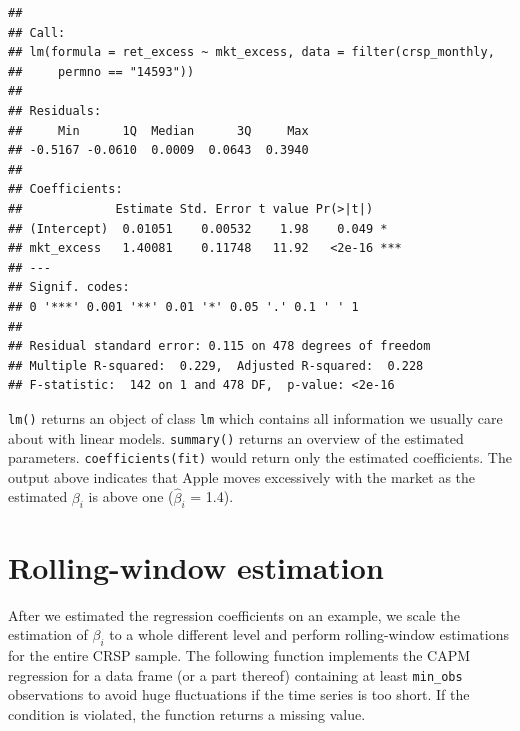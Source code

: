 \documentclass[
]{book}
\newenvironment{Shaded}{\begin{snugshade}}{\end{snugshade}}
\newcommand{\AttributeTok}[1]{\textcolor[rgb]{0.61,0.61,0.61}{#1}}
\newcommand{\ConstantTok}[1]{\textcolor[rgb]{0,0,0}{#1}}
\newcommand{\ControlFlowTok}[1]{\textcolor[rgb]{0.27,0.27,0.27}{\textbf{#1}}}
\newcommand{\DecValTok}[1]{\textcolor[rgb]{0.06,0.06,0.06}{#1}}
\newcommand{\FunctionTok}[1]{\textcolor[rgb]{0,0,0}{#1}}
\newcommand{\NormalTok}[1]{#1}
\newcommand{\OtherTok}[1]{\textcolor[rgb]{0.37,0.37,0.37}{#1}}
\newcommand{\SpecialCharTok}[1]{\textcolor[rgb]{0,0,0}{#1}}
\begin{document}
\begin{verbatim}
## 
## Call:
## lm(formula = ret_excess ~ mkt_excess, data = filter(crsp_monthly, 
##     permno == "14593"))
## 
## Residuals:
##     Min      1Q  Median      3Q     Max 
## -0.5167 -0.0610  0.0009  0.0643  0.3940 
## 
## Coefficients:
##             Estimate Std. Error t value Pr(>|t|)    
## (Intercept)  0.01051    0.00532    1.98    0.049 *  
## mkt_excess   1.40081    0.11748   11.92   <2e-16 ***
## ---
## Signif. codes:  
## 0 '***' 0.001 '**' 0.01 '*' 0.05 '.' 0.1 ' ' 1
## 
## Residual standard error: 0.115 on 478 degrees of freedom
## Multiple R-squared:  0.229,  Adjusted R-squared:  0.228 
## F-statistic:  142 on 1 and 478 DF,  p-value: <2e-16
\end{verbatim}

\texttt{lm()} returns an object of class \texttt{lm} which contains all information we usually care about with linear models. \texttt{summary()} returns an overview of the estimated parameters. \texttt{coefficients(fit)} would return only the estimated coefficients. The output above indicates that Apple moves excessively with the market as the estimated \(\beta_i\) is above one (\(\hat\beta_i\) = 1.4).

\hypertarget{rolling-window-estimation}{%
\section{Rolling-window estimation}\label{rolling-window-estimation}}

After we estimated the regression coefficients on an example, we scale the estimation of \(\beta_i\) to a whole different level and perform rolling-window estimations for the entire CRSP sample. The following function implements the CAPM regression for a data frame (or a part thereof) containing at least \texttt{min\_obs} observations to avoid huge fluctuations if the time series is too short. If the condition is violated, the function returns a missing value.

\begin{Shaded}
\end{Shaded}
\end{document}
